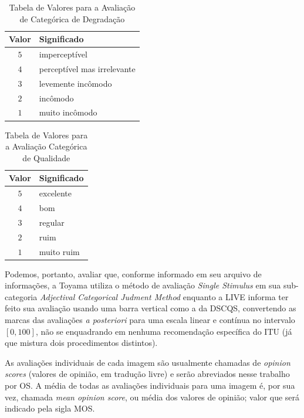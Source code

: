 \begin{table}[htb]
	\footnotesize
	\caption[Avaliação de Degradação]{Tabela de Valores para a Avaliação de Categórica de Degradação}
	\label{tab:avDeg}
	\centering
 	\begin{tabular}{ c | l } %
		\textbf{Valor}	&	\textbf{Significado}		\\\hline %
		$5$		&	imperceptível			\\
		$4$		&	perceptível mas irrelevante	\\
		$3$		&	levemente incômodo		\\
		$2$		&	incômodo			\\
		$1$		&	muito incômodo			\\ \hline
	\end {tabular}
	\par
\end{table}

\begin{table}[htb]
	\footnotesize
	\caption[Avaliação de Qualidade]{Tabela de Valores para a Avaliação Categórica de Qualidade}
	\label{tab:avQual}
	\centering
	\begin{tabular}{ c | l }
		\textbf{Valor}	&	\textbf{Significado}		\\\hline %
		$5$		&	excelente	\\
		$4$		&	bom		\\
		$3$		&	regular		\\
		$2$		&	ruim		\\
		$1$		&	muito ruim	\\ \hline
	\end {tabular}
	\par
\end{table}

Podemos, portanto, avaliar que, conforme informado em seu arquivo de informações, a Toyama utiliza o método de avaliação \emph{Single Stimulus} em sua sub-categoria \emph{Adjectival Categorical Judment Method} enquanto a LIVE informa ter feito sua avaliação usando uma barra vertical como a da DSCQS, convertendo as marcas das avaliações \emph{a posteriori} para uma escala linear e contínua no intervalo $[0,100]$, não se enquadrando em nenhuma recomendação específica do ITU (já que mistura dois procedimentos distintos).

As avaliações individuais de cada imagem são usualmente chamadas de \emph{opinion scores} (valores de opinião, em tradução livre) e serão abreviados nesse trabalho por OS. A média de todas as avaliações individuais para uma imagem é, por sua vez, chamada \emph{mean opinion score}, ou média dos valores de opinião; valor que será indicado pela sigla MOS.

